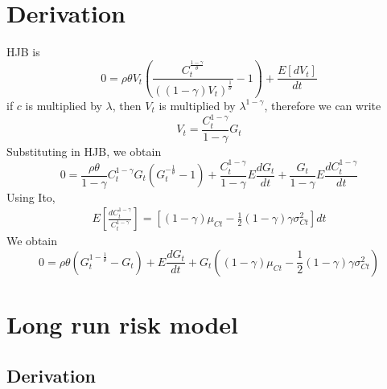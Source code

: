 \documentclass[english]{article}
\begin{document}
\section{Derivation}
HJB is
$$0 = \rho \theta V_t(\frac{C_t^{\frac{1-\gamma}{\theta}}}{((1-\gamma)V_t)^{\frac{1}{\theta}}}-1) + \frac{E[dV_t]}{dt}$$
if $c$ is multiplied by $\lambda$, then  $V_t$ is multiplied by $\lambda^{1-\gamma}$, therefore we can write
$$V_t = \frac{C_t^{1-\gamma}}{1-\gamma} G_t$$
Substituting in HJB, we obtain
$$0 = \frac{\rho\theta}{1-\gamma}C_t^{1-\gamma}G_t(G_t^{-\frac{1}{\theta}}-1) + \frac{C_t^{1-\gamma}}{1-\gamma}E\frac{dG_t}{dt} +  \frac{G_t}{1-\gamma}E\frac{dC_t^{1-\gamma}}{dt}$$
Using Ito, 
\begin{align*}
	E[\frac{dC_{t}^{1-\gamma}}{C_{t}^{1-\gamma}}]=\left[(1-\gamma)\mu_{Ct}-\frac{1}{2}(1-\gamma)\gamma\sigma^{2}_{Ct}\right]dt
\end{align*}
We obtain 
$$0 = \rho \theta (G_t^{1-\frac{1}{\theta}}-G_t) + E\frac{dG_t}{dt} + G_t ((1-\gamma) \mu_{Ct} - \frac{1}{2}(1-\gamma)\gamma\sigma_{Ct}^2)$$

\section{Long run risk model}
\subsection{Derivation}
\end{document}
